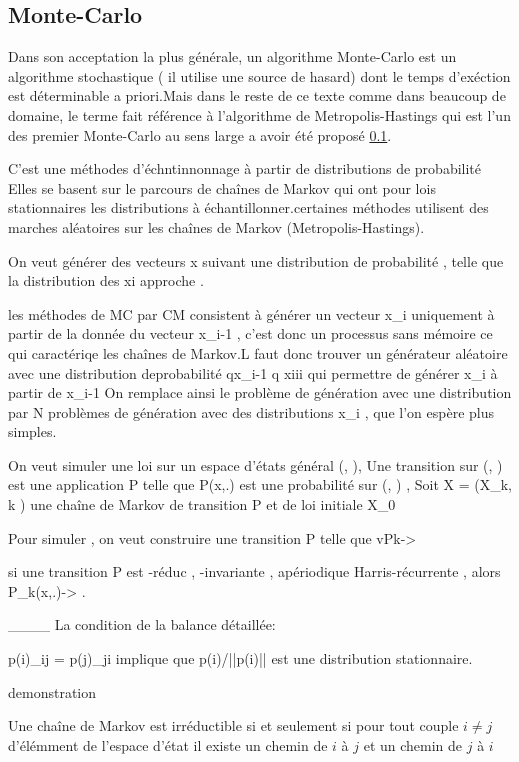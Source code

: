 \subsection{Monte-Carlo}

Dans son acceptation la plus générale, un algorithme Monte-Carlo est un algorithme stochastique ( il utilise une source de hasard) dont le temps d'exéction est déterminable a priori.Mais dans le reste de ce texte  comme dans beaucoup de domaine, le terme fait référence à l'algorithme de Metropolis-Hastings qui est l'un des premier Monte-Carlo au sens large a avoir été proposé \ref{}.


C'est une méthodes d'échntinnonnage à partir de distributions de probabilité
Elles se basent sur le parcours de chaînes de Markov qui ont pour lois stationnaires les distributions à échantillonner.certaines méthodes utilisent des marches aléatoires sur les chaînes de Markov (Metropolis-Hastings).

On veut générer des vecteurs x suivant une distribution de probabilité \pi , telle que la distribution des xi approche \pi.

les méthodes de MC par CM consistent à générer un vecteur x_i uniquement à partir de la donnée du vecteur x_i-1 , c'est donc un processus sans mémoire ce qui caractériqe les chaînes de Markov.L faut donc trouver un générateur aléatoire avec une distribution deprobabilité qx_i-1 q xiii qui permettre de générer x_i  à partir de x_{i-1} On remplace ainsi le problème  de génération avec une distribution \pi  par N problèmes de génération avec des distributions x_i , que l'on espère plus simples.

On veut simuler une loi \pi sur un espace d'états général (\Omega, \Epsilon),
Une transition sur (\Omega, \Epsilon)  est une application P telle que P(x,.) est une probabilité sur (\Omega, \Epsilon) , Soit X = (X_k, k \in \Natural) une chaîne de Markov de transition P et de loi initiale X_0

Pour simuler \pi , on veut construire une transition P telle que vPk-> \pi

si une transition P est \pi-réduc , \pi-invariante , apériodique Harris-récurrente , alors P_k(x,.)-> \pi.

____
La condition de la balance détaillée:


p(i)\pi_{ij} = p(j)\pi_{ji} implique que p(i)/||p(i)|| est une distribution stationnaire.

demonstration


Une chaîne de Markov est irréductible si et seulement si pour tout couple   $i \neq j$   d'élémment de l'espace d'état il existe un chemin de   $i$  à   $j$   et un chemin de   $j$ à $i$ 





